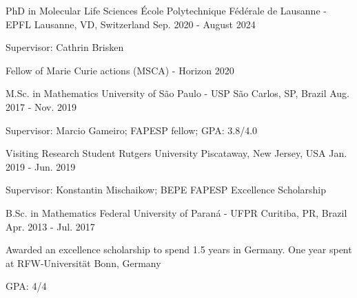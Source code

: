 

\begin{cventries}

  \cventry
    {PhD in Molecular Life Sciences} %
    {École Polytechnique Fédérale de Lausanne - EPFL} %
    {Lausanne, VD, Switzerland} %
    {Sep. 2020 - August 2024}
    {\begin{cvitems}
        \item{Supervisor: Cathrin Brisken}
        \item{Fellow of Marie Curie actions (MSCA) - Horizon 2020}
     \end{cvitems}
    }


  \cventry
    {M.Sc. in Mathematics} %
    {University of São Paulo - USP} %
    {São Carlos, SP, Brazil} %
    {Aug. 2017 - Nov. 2019}
    {
      \begin{cvitems} %
        \item{Supervisor: Marcio Gameiro; FAPESP fellow; GPA: 3.8/4.0}
      \end{cvitems}
    }

  \cventry
    {Visiting Research Student}
    {Rutgers University}
    {Piscataway, New Jersey, USA}
    {Jan. 2019 - Jun. 2019}
    {
      \begin{cvitems}
        \item{Supervisor: Konstantin Mischaikow; BEPE FAPESP Excellence Scholarship}
      \end{cvitems}
    }

  \cventry
    {B.Sc. in Mathematics} %
    {Federal University of Paraná - UFPR} %
    {Curitiba, PR, Brazil} %
    {Apr. 2013 - Jul. 2017} %
    {
      \begin{cvitems} %
        \item{Awarded an excellence scholarship to spend 1.5 years in Germany.
              One year spent at RFW-Universität Bonn, Germany}
        \item{GPA: 4/4}
      \end{cvitems}
    }

\end{cventries}
